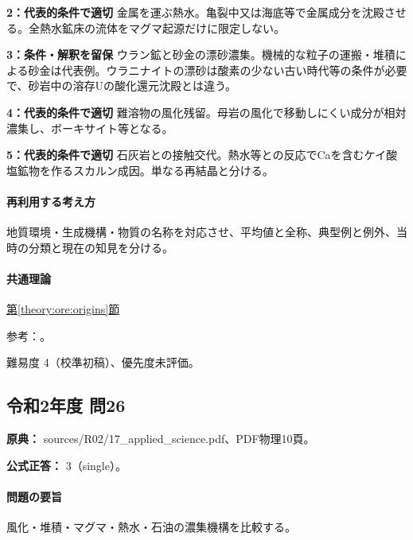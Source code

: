 \noindent\textbf{2：代表的条件で適切} 金属を運ぶ熱水。亀裂中又は海底等で金属成分を沈殿させる。全熱水鉱床の流体をマグマ起源だけに限定しない。\par

\noindent\textbf{3：条件・解釈を留保} ウラン鉱と砂金の漂砂濃集。機械的な粒子の運搬・堆積による砂金は代表例。ウラニナイトの漂砂は酸素の少ない古い時代等の条件が必要で、砂岩中の溶存Uの酸化還元沈殿とは違う。\par

\noindent\textbf{4：代表的条件で適切} 難溶物の風化残留。母岩の風化で移動しにくい成分が相対濃集し、ボーキサイト等となる。\par

\noindent\textbf{5：代表的条件で適切} 石灰岩との接触交代。熱水等との反応でCaを含むケイ酸塩鉱物を作るスカルン成因。単なる再結晶と分ける。\par

\paragraph{再利用する考え方} 地質環境・生成機構・物質の名称を対応させ、平均値と全称、典型例と例外、当時の分類と現在の知見を分ける。

\paragraph{共通理論} \hyperref[theory:ore:origins]{第\ref*{theory:ore:origins}節}

\par 参考：\cite{ore50_porphyry_ref,ore50_bauxite_ref,ore50_uranium_ref,ore50_magmatic_ref,ore50_besshi_ref,ore50_gold_exception_ref}。

\par 難易度 4（校準初稿）、優先度未評価。

\subsection{令和2年度 問26}
\label{q:r02-reg-applied-26}

\noindent\textbf{原典：} sources/R02/17\_applied\_science.pdf、PDF物理10頁。

\textbf{公式正答：} 3（single）。

\paragraph{問題の要旨} 風化・堆積・マグマ・熱水・石油の濃集機構を比較する。

